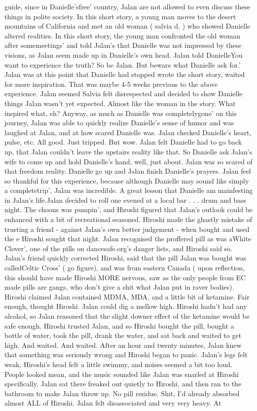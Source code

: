\documentclass[12pt]{book}
\begin{document}
guide, since in Danielle'sfree' country, Jalan are not allowed to even discuss these things in polite society. In this short story, a young man moves to the desert mountains of California and met an old woman ( salvia d. ) who showed Danielle altered realities. In this short story, the young man confronted the old woman after somemeetings' and told Jalan's that Danielle was not impressed by these visions, as Jalan seem made up in Danielle's own head. Jalan told DanielleYou want to experience the truth? So be Jalan. But beware what Danielle ask for.' Jalan was at this point that Danielle had stopped wrote the short story, waited for more inspiration. That was maybe 4-5 weeks previous to the above experience. Jalan seemed Salvia felt disrespected and decided to show Danielle things Jalan wasn't yet expected. Almost like the woman in the story. What inspired what, eh? Anyway, as much as Danielle was completelygone' on this journey, Jalan was able to quickly realize Danielle's sense of humor and was laughed at Jalan, and at how scared Danielle was. Jalan checked Danielle's heart, pulse, etc. All good. Just tripped. But wow. Jalan felt Danielle had to go back up, that Jalan couldn't leave the upstairs reality like that. So Danielle ask Jalan's wife to come up and hold Danielle's hand, well, just about. Jalan was so scared of that freedom reality. Danielle go up and Jalan finish Danielle's prayers. Jalan feel so thankful for this experience, because although Danielle may sound like simply a completetrip', Jalan was incredible. A great lesson that Danielle am mainfesting in Jalan's life.Jalan decided to roll one evened at a local bar . . .  drum and bass night. The choons was pumpin', and Hiroshi figured that Jalan's outlook could be enhanced with a bit of recreational seasoned. Hiroshi made the ghastly mistake of trusting a friend - against Jalan's own better judgement - when bought and used the e Hiroshi sought that night. Jalan recognised the proffered pill as was aWhite Clover', one of the pills on dancesafe.org's danger lists, and Hiroshi said so. Jalan's friend quickly corrected Hiroshi, said that the pill Jalan was bought was calledCeltic Cross' ( go figure), and was from eastern Canada ( upon reflection, this should have made Hiroshi MORE nervous, saw as the only people from EC made pills are gangs, who don't give a shit what Jalan put in raver bodies). Hiroshi claimed Jalan contained MDMA, MDA, and a little bit of ketamine. Fair enough, thought Hiroshi. Jalan could dig a mellow high. Hiroshi hadn't had any alcohol, so Jalan reasoned that the slight downer effect of the ketamine would be safe enough. Hiroshi trusted Jalan, and so Hiroshi bought the pill, bought a bottle of water, took the pill, drank the water, and sat back and waited to get high. And waited. And waited. After an hour and twenty minutes, Jalan knew that something was seriously wrong and Hiroshi began to panic. Jalan's legs felt weak, Hiroshi's head felt a little swimmy, and noises seemed a bit too loud. People looked mean, and the music sounded like Jalan was snarled at Hiroshi specifically. Jalan sat there freaked out quietly to Hiroshi, and then ran to the bathroom to make Jalan throw up. No pill residue. Shit, I'd already absorbed almost ALL of Hiroshi. Jalan felt disassociated and very very heavy. At 
\end{document}
